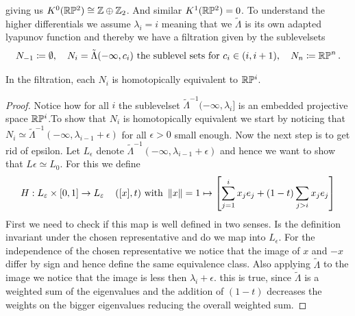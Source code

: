 \begin{example}
\begin{center}
\begin{tikzcd}
			\end{tikzcd}
		\end{center} giving us $K^0(\mathbb{R}\mathbb{P}^2)\cong \mathbb{Z}\oplus \mathbb{Z}_2$. 
		And similar $K^1(\mathbb{R}\mathbb{P}^2)=0$. 
		To understand the higher differentials we assume $\lambda_i=i$ meaning that we $\tilde{\Lambda}$ is its own adapted lyapunov function and thereby we have a filtration given by the sublevelsets
		\begin{equation*}
		N_{-1}\coloneq \emptyset,\quad N_i=\tilde{\Lambda}(-\infty,c_i) \text{ the sublevel sets for }c_i\in(i,i+1), \quad N_n\coloneq \mathbb{R}\mathbb{P}^n\,. 
	\end{equation*} 
	\begin{lemma}
		In the filtration, each $N_i$ is homotopically equivalent to $\mathbb{R}\mathbb{P}^i$. 
	\end{lemma}
	\begin{proof}

Notice how for all $i$ the sublevelset $\tilde{\Lambda}^{-1}(-\infty,\lambda_i]$ is an embedded projective space $\mathbb{R}\mathbb{P}^i$.To show that $N_i$ is homotopically equivalent we start by noticing that $N_i\simeq \tilde{\Lambda}^{-1}(-\infty,\lambda_{i-1}+\epsilon)$ for all $\epsilon>0$ small enough. Now the next step is to get rid of epsilon. Let $L_\epsilon$ denote $\tilde{\Lambda}^{-1}(-\infty,\lambda_{i-1}+\epsilon)$ and hence we want to show that $L{\epsilon}\simeq L_0$. For this we define 
\begin{equation*}
	H:L_\varepsilon \times [0,1] \to L_\varepsilon\,\quad ([x],t) \text{ with }\left\lVert x\right\rVert=1 \mapsto \left[\sum_{j=1}^i x_je_j +(1-t)\sum_{j>i}x_je_j \right] 
\end{equation*} 
First we need to check if this map is well defined in two senses. Is the definition invariant under the chosen representative and do we map into $L_\epsilon$. 
For the independence of the chosen representative we notice that the image of $x$ and $-x$ differ by sign and hence define the same equivalence class. Also applying $\tilde{\Lambda}$ to the image we notice that the image is less then $\lambda_{i}+\epsilon$. this is true, since $\tilde{\Lambda}$ is a weighted sum of the eigenvalues and the addition of $(1-t)$ decreases the weights on the bigger eigenvalues reducing the overall weighted sum. 


\end{proof}
\end{example}
